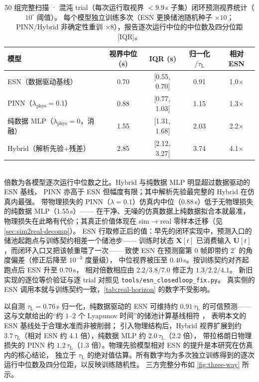 \documentclass[a4paper,12pt]{ctexart}   %
\let\cite\supercite   %
\newcommand{\tauL}{\tau_{\mathrm{L}}}              %
\renewcommand{\emph}[1]{#1}
\begin{document}
\begin{table}[h]
\centering
\caption{50 组完整扫描 · 混沌 trial（每次运行取视界 $< 9.9$\,s 子集）闭环预测视界统计（$10^\circ$ 阈值）。
每个模型独立训练多次（ESN 更换储池随机种子 $\times 10$；PINN/Hybrid 非确定性重训 $\times 8$），报告逐次运行中位的中位数及四分位距 [IQR]。}
\label{tab:horizon-compare}
\begin{tabular}{lcccc}
\toprule
模型 & 视界中位 (s) & IQR (s) & 归一化 $/\tauL$ & 相对 ESN \\
\midrule
ESN（数据驱动基线）            & 0.70 & [0.55,\,0.70] & 0.91 & 1.0$\times$ \\
PINN（$\lambda_{\text{phys}}{=}0.1$） & 0.88 & [0.77,\,1.03] & 1.15 & 1.3$\times$ \\
纯数据 MLP（$\lambda_{\text{phys}}{=}0$，消融） & 1.55 & [1.31,\,1.68] & 2.03 & 2.2$\times$ \\
Hybrid（解析先验$+$残差）       & 2.85 & [2.12,\,3.27] & 3.74 & 4.1$\times$ \\
\bottomrule
\end{tabular}
\\[1em]
\footnotesize 倍数为各模型逐次运行中位数之比。Hybrid 与纯数据 MLP 明显超过数据驱动的 ESN 基线，
PINN 亦高于 ESN 但幅度有限；其中解析先验最完整的 Hybrid 在仿真内最强。
带物理损失的 PINN（$\lambda{=}0.1$）仿真内中位（0.88\,s）低于无物理损失的纯数据 MLP（1.55\,s）——
在干净、无噪的仿真数据上纯数据拟合本就最准，物理损失在此略有代价；其真正价值体现在
sim$\to$real 零样本迁移（见 \cref{sec:sim2real-decomp}）。
\emph{ESN 行取修正后的值}：早先的闭环实现中，预测入口的储池起跑点与训练契约相差一个储池步——
训练时状态 $\bm{X}[t]$ 已消费输入 $\bm{U}[t]$，而闭环入口又把该帧重喂了一次——
致使 ESN 在预测窗第 $0$ 帧即带约 $2^\circ$ 的角度偏差（修正后降至 $10^{-3}$ 度量级），
中位视界被压至 $0.40$\,s。按训练契约对齐起跑点后 ESN 升至 $0.70$\,s，
相对倍数相应由 $2.2 / 3.8 / 7.0$ 修正为 $1.3 / 2.2 / 4.1$。
新旧实现的逐位等价验证与逐 trial 对照见 \texttt{tools/esn\_closedloop\_fix.py}。
真实侧的 ESN 调用本就与训练契约一致，\cref{tab:real-horizon} 的数字不受影响。
\end{table}

\noindent 以自测 $\tauL = 0.76$\,s 归一化，纯数据驱动的 ESN 可维持约 $0.91\,\tauL$ 的可信预测——
这与文献给出的“约 $1$--$2$ 个 Lyapunov 时间”的储池计算基线相符 \cite{lu2017reservoir,pathak2018}，
表明本文的 ESN 基线处于合理水准而非被削弱；
引入物理结构后，Hybrid 视界扩展到约 $3.7\,\tauL$（相对 ESN 约 4.1 倍），纯数据 MLP 约 $2.0\,\tauL$（2.2 倍），
带拉格朗日物理损失的 PINN 约 $1.2\,\tauL$（1.3 倍）。物理先验模型相对 ESN 的提升是本研究在仿真内的核心结论，
独立于 $\tauL$ 的绝对值估算。所有数字均为多次独立训练得到的逐次运行中位数及四分位距，以反映训练随机性。
三方完整分布如 \cref{fig:three-way} 所示。
\end{document}
